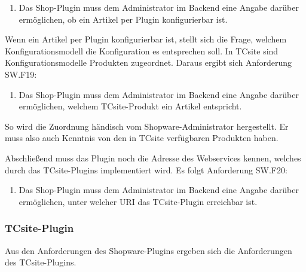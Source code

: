 \documentclass[12pt,a4paper,bibliography=totocnumbered,listof=totoc]{scrartcl}
\begin{document}
\begin{enumerate}[SW.F18:]\bfseries
\item Das Shop-Plugin muss dem Administrator im Backend eine Angabe darüber ermöglichen, ob ein Artikel per Plugin konfigurierbar ist.
\end{enumerate}
Wenn ein Artikel per Plugin konfigurierbar ist, stellt sich die Frage, welchem Konfigurationsmodell die Konfiguration es entsprechen soll. In TCsite sind Konfigurationsmodelle Produkten zugeordnet. Daraus ergibt sich Anforderung SW.F19:
\begin{enumerate}[SW.F18:]\bfseries
\item Das Shop-Plugin muss dem Administrator im Backend eine Angabe darüber ermöglichen, welchem TCsite-Produkt ein Artikel entspricht.
\end{enumerate}
So wird die Zuordnung händisch vom Shopware-Administrator hergestellt. Er muss also auch Kenntnis von den in TCsite verfügbaren Produkten haben.

Abschließend muss das Plugin noch die Adresse des Webservices kennen, welches durch das TCsite-Plugins implementiert wird. Es folgt Anforderung SW.F20:
\begin{enumerate}[SW.F19:]\bfseries
\item Das Shop-Plugin muss dem Administrator im Backend eine Angabe darüber ermöglichen, unter welcher URI das TCsite-Plugin erreichbar ist.
\end{enumerate}

\subsubsection{TCsite-Plugin}
Aus den Anforderungen des Shopware-Plugins ergeben sich die Anforderungen des TCsite-Plugins.
\end{document}
